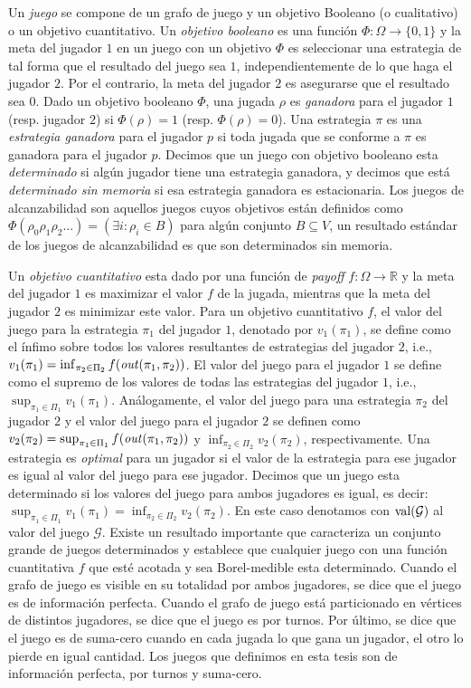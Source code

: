 Un \emph{juego} se compone de un grafo de juego y un objetivo Booleano (o cualitativo) o un objetivo cuantitativo. Un \emph{objetivo booleano} es una función $\Phi: \Omega \rightarrow \{0, 1\}$ y la meta del jugador $1$ en un juego con un objetivo $\Phi$ es seleccionar una estrategia de tal forma que el resultado del juego sea $1$, independientemente de lo que haga el jugador $2$. Por el contrario, la meta del jugador $2$ es asegurarse que el resultado sea $0$. Dado un objetivo booleano $\Phi$, una jugada $\rho$ es \emph{ganadora} para el jugador $1$ (resp. jugador $2$) si  $\Phi(\rho) = 1$ (resp. $\Phi(\rho) = 0$). Una estrategia $\pi$ es una \emph{estrategia ganadora} para el jugador $p$ si toda jugada que se conforme a $\pi$ es ganadora para el jugador $p$. Decimos que un juego con objetivo booleano esta \emph{determinado} si algún jugador tiene una estrategia ganadora, y decimos que está \emph{determinado sin memoria} si esa estrategia ganadora es estacionaria. Los juegos de alcanzabilidad son aquellos juegos cuyos objetivos están definidos como $\Phi(\rho_0 \rho_1 \rho_2 \dots) = (\exists i : \rho_i \in B)$ para algún conjunto $B \subseteq V$, un resultado estándar de los juegos de alcanzabilidad es que son determinados sin memoria.

Un \emph{objetivo cuantitativo} esta dado por una función de \emph{payoff} $f: \Omega \rightarrow \mathbb{R}$ y la meta del jugador $1$ es maximizar el valor $f$ de la jugada, mientras que la meta del jugador $2$ es minimizar este valor. Para un objetivo cuantitativo $f$, el valor del juego para la estrategia $\pi_1$ del jugador $1$, denotado por $v_1(\pi_1)$, se define como el ínfimo sobre todos los valores resultantes de estrategias del jugador $2$, i.e., $v_1(\pi_1) = \inf_{\pi_2 \in \Pi_2} f(\mathit{out}(\pi_1, \pi_2))$. El valor del juego para el jugador $1$ se define como el supremo de los valores de todas las estrategias del jugador $1$, i.e., $\sup_{\pi_1 \in \Pi_1} v_1(\pi_1)$. Análogamente, el valor del juego para una estrategia $\pi_2$ del jugador $2$ y el valor del juego para el jugador $2$ se definen como $v_2(\pi_2) = \sup_{\pi_1 \in \Pi_1} f(\mathit{out}(\pi_1, \pi_2))$ 
y $\inf_{\pi_2 \in \Pi_2} v_2(\pi_2)$, respectivamente.
Una estrategia es \emph{optimal} para un jugador si el valor de la estrategia para ese jugador es igual al valor del juego para ese jugador. Decimos que un juego esta determinado si los valores del juego para ambos jugadores es igual, es decir:
$\sup_{\pi_1 \in \Pi_1} v_1(\pi_1) = \inf_{\pi_2 \in \Pi_2} v_2(\pi_2)$. En este caso denotamos con $\mathop{\textup{val}}(\mathcal{G})$ al valor del juego $\mathcal{G}$.
Existe un resultado importante \cite{Martin98} que caracteriza un conjunto grande de juegos determinados y establece que cualquier juego con una función cuantitativa $f$ que esté acotada y sea Borel-medible esta determinado.
Cuando el grafo de juego es visible en su totalidad por ambos jugadores, se dice que el juego es de información perfecta. Cuando el grafo de juego está particionado en vértices de distintos jugadores, se dice que el juego es por turnos.
Por último, se dice que el juego es de suma-cero cuando en cada jugada lo que gana un jugador, el otro lo pierde en igual cantidad. Los juegos que definimos en esta tesis son de información perfecta, por turnos y suma-cero.

